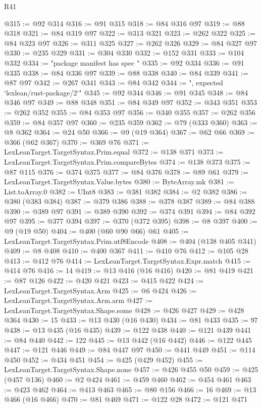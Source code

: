 \begin{lexlean}{R41}
\begin{coremodule}
@315 := @92 @314
@316 := @91 @315
@318 := @84 @316 @97
@319 := @88 @318
@321 := @84 @319 @97
@322 := @313 @321
@323 := @262 @322
@325 := @84 @323 @97
@326 := @311 @325
@327 := @262 @326
@329 := @84 @327 @97
@330 := @235 @329
@331 := @304 @330
@332 := @152 @331
@333 := @104 @332
@334 := "package manifest has spec "
@335 := @92 @334
@336 := @91 @335
@338 := @84 @336 @97
@339 := @88 @338
@340 := @84 @339
@341 := @87 @97
@342 := @267 @341
@343 := @84 @342
@344 := ", expected `lexlean/rust-package/2`"
@345 := @92 @344
@346 := @91 @345
@348 := @84 @346 @97
@349 := @88 @348
@351 := @84 @349 @97
@352 := @343 @351
@353 := @262 @352
@355 := @84 @353 @97
@356 := @340 @355
@357 := @262 @356
@359 := @84 @357 @97
@360 := @235 @359
@362 := @79 (@333 @360)
@363 := @8 @362
@364 := @24 @50
@366 := @9 (@19 @364)
@367 := @62 @66
@369 := @366 (@62 @367)
@370 := @369 @76
@371 := LexLeanTarget.TargetSyntax.Prim.equal
@372 := @138 @371
@373 := LexLeanTarget.TargetSyntax.Prim.compareBytes
@374 := @138 @373
@375 := @87 @115
@376 := @374 @375
@377 := @84 @376
@378 := @89 @61
@379 := LexLeanTarget.TargetSyntax.Value.bytes
@380 := ByteArray.mk
@381 := List.toArray.{0}
@382 := UInt8
@383 := @381 @382
@384 := @2 @382
@386 := @380 (@383 @384)
@387 := @379 @386
@388 := @378 @387
@389 := @84 @388
@390 := @389 @97
@391 := @389 @390
@392 := @374 @391
@394 := @84 @392 @97
@395 := @377 @394
@397 := @370 (@372 @395)
@398 := @8 @397
@400 := @9 (@19 @50)
@404 := @400 (@60 @90 @66) @61
@405 := LexLeanTarget.TargetSyntax.Prim.utf8Encode
@408 := @404 (@138 @405 @341)
@409 := @8 @408
@410 := @400 @367
@411 := @410 @76
@412 := @105 @28
@413 := @412 @76
@414 := LexLeanTarget.TargetSyntax.Expr.match
@415 := @414 @76
@416 := 14
@419 := @13 @416 (@16 @416)
@420 := @81 @419
@421 := @87 @126
@422 := @420 @421
@423 := @415 @422
@424 := LexLeanTarget.TargetSyntax.Arm
@425 := @6 @424
@426 := LexLeanTarget.TargetSyntax.Arm.arm
@427 := LexLeanTarget.TargetSyntax.Shape.some
@428 := @426 @427
@429 := @428 @364
@430 := 15
@433 := @13 @430 (@16 @430)
@434 := @81 @433
@435 := 97
@438 := @13 @435 (@16 @435)
@439 := @122 @438
@440 := @121 @439
@441 := @84 @440
@442 := 122
@445 := @13 @442 (@16 @442)
@446 := @122 @445
@447 := @121 @446
@449 := @84 @447 @97
@450 := @441 @449
@451 := @114 @450
@452 := @434 @451
@454 := @425 (@429 @452)
@455 := LexLeanTarget.TargetSyntax.Shape.none
@457 := @426 @455 @50
@459 := @425 (@457 @136)
@460 := @2 @424
@461 := @459 @460
@462 := @454 @461
@463 := @423 @462
@464 := @413 @463
@465 := @80 @156
@466 := 16
@469 := @13 @466 (@16 @466)
@470 := @81 @469
@471 := @122 @28
@472 := @121 @471

\end{coremodule}
\end{lexlean}
